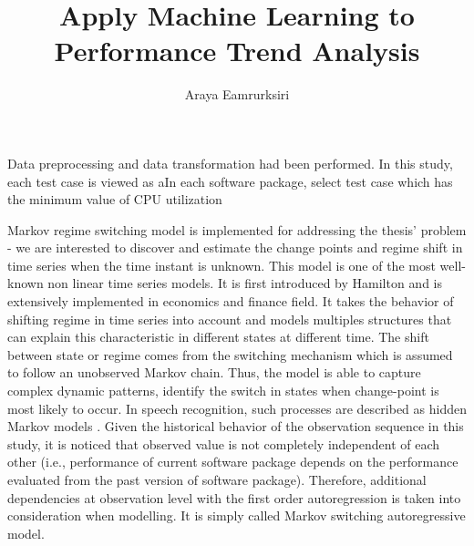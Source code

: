 \documentclass[]{article}
\title{Apply Machine Learning to Performance Trend Analysis}
\author{Araya Eamrurksiri}
\begin{document}
\date{}
\maketitle

Data preprocessing and data transformation had been performed. In this study, each test case is viewed as aIn each software package, select test case which has the minimum value of CPU utilization

Markov regime switching model is implemented for addressing the thesis' problem - we are interested to discover and estimate the change points and regime shift in time series when the time instant is unknown. This model is one of the most well-known non linear time series models. It is first introduced by Hamilton \cite{hamilton1989new} and is extensively implemented in economics and finance field. It takes the behavior of shifting regime in time series into account and models multiples structures that can explain this characteristic in different states at different time. The shift between state or regime comes from the switching mechanism which is assumed to follow an unobserved Markov chain. Thus, the model is able to capture complex dynamic patterns, identify the switch in states when change-point is most likely to occur. In speech recognition, such processes are described as hidden Markov models \cite{rabiner1989tutorial}. Given the historical behavior of the observation sequence in this study, it is noticed that observed value is not completely independent of each other (i.e., performance of current software package depends on the performance evaluated from the past version of software package). Therefore, additional dependencies at observation level with the first order autoregression is taken into consideration when modelling. It is simply called Markov switching autoregressive model.
\end{document}
